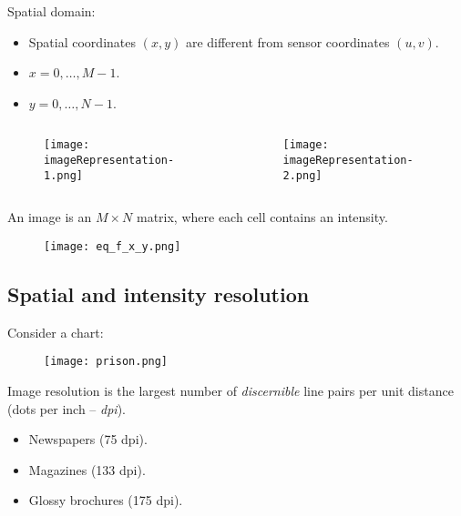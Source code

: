 \begin{frame}
Spatial domain:
\begin{itemize}
\item Spatial coordinates $(x,y)$ are different from sensor coordinates $(u,v)$.
\item $x=0,\ldots,M-1$.
\item $y=0,\ldots,N-1$.
\end{itemize}
\begin{columns}
\begin{column}{.4\textwidth}
\begin{figure}
\texttt{[image: imageRepresentation-1.png]}
\end{figure}
\end{column}
\begin{column}{.6\textwidth}
\begin{figure}
\texttt{[image: imageRepresentation-2.png]}
\end{figure}
\end{column}
\end{columns}
\end{frame}


\begin{frame}
An image is an $M\times N$ matrix, where each cell contains an intensity.
\begin{figure}
\texttt{[image: eq\_f\_x\_y.png]}
\end{figure}
\end{frame}


\subsection{Spatial and intensity resolution}


\begin{frame}
Consider a chart:
\begin{figure}
\texttt{[image: prison.png]}
\end{figure}
Image resolution is the largest number of \textit{discernible} line pairs per unit distance (dots per inch -- \textit{dpi}).
\begin{itemize}
\item Newspapers (75 dpi).
\item Magazines (133 dpi).
\item Glossy brochures (175 dpi).
\end{itemize}
\end{frame}

